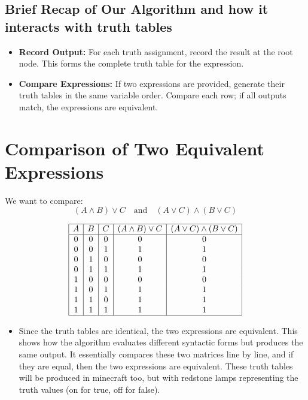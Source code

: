 \documentclass[11pt]{diazessay} %
\begin{document}
\subsection{Brief Recap of Our Algorithm and how it interacts with truth tables}
\begin{itemize}
    \item \textbf{Record Output:} For each truth assignment, record the result at the root node. This forms the complete truth table for the expression.
    \item \textbf{Compare Expressions:} If two expressions are provided, generate their truth tables in the same variable order. Compare each row; if all outputs match, the expressions are equivalent.
\end{itemize}

\section*{Comparison of Two Equivalent Expressions}

We want to compare:
\[
(A \wedge B) \vee C \quad \text{and} \quad (A \vee C) \wedge (B \vee C)
\]

\bigskip

\[
\begin{array}{|c|c|c|c|c|}
\hline
A & B & C & (A \land B) \lor C & (A \lor C) \land (B \lor C) \\
\hline
0 & 0 & 0 & 0 & 0 \\
0 & 0 & 1 & 1 & 1 \\
0 & 1 & 0 & 0 & 0 \\
0 & 1 & 1 & 1 & 1 \\
1 & 0 & 0 & 0 & 0 \\
1 & 0 & 1 & 1 & 1 \\
1 & 1 & 0 & 1 & 1 \\
1 & 1 & 1 & 1 & 1 \\
\hline
\end{array}
\]

\bigskip

\begin{itemize}
    \item Since the truth tables are identical, the two expressions are equivalent.  
This shows how the algorithm evaluates different syntactic forms but produces the same output. It essentially compares these two matrices line by line, and if they are equal, then the two expressions are equivalent.
These truth tables will be produced in minecraft too, but with redstone lamps representing the truth values (on for true, off for false).
\end{itemize}
\end{document}
